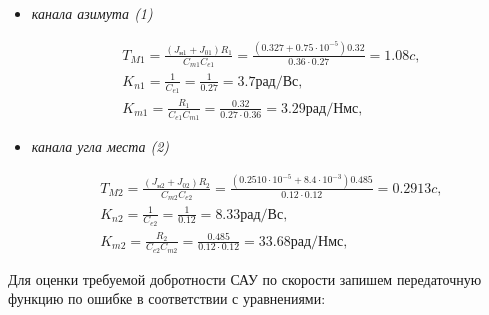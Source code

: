 \begin{itemize}
	\item \textit{канала азимута (1)}
	
	\begin{equation}
	\label{eq:p4:sec4/4}
	\begin{alignedat}{2}
	T_{M1}=
	\frac{ \left( J_{\textit{н1}}+J_{01} \right) R_{1}}{C_{m1}C_{e1}}=\frac{ \left( 0.327 + 0.75 \cdot 10^{-5} \right) 0.32}{0.36 \cdot 0.27}=
	1.08 \textit{c} ,\\
	K_{n1} = \frac{1}{C_{e1}} = \frac{1}{0.27} = 3.7 \textit{рад/Вс},\\
	K_{m1} = \frac{R_1}{C_{e1} C_{m1}} = \frac{0.32}{0.27 \cdot 0.36} = 3.29 \textit{рад/Нмс},
	\end{alignedat}
	\end{equation}
	
	\item \textit{канала угла места (2)}
	
	\begin{equation}
	\label{eq:p4:sec4/4+}
	\begin{alignedat}{2}
	T_{M2}=
	\frac{ \left( J_{\textit{н2}}+J_{02} \right) R_{2}}{C_{m2}C_{e2}}=\frac{ \left( 0.2510 \cdot 10^{-5} + 8.4 \cdot 10^{-3} \right) 0.485}{0.12 \cdot 0.12}=
	0.2913 \textit{c} ,\\
	K_{n2} = \frac{1}{C_{e2}} = \frac{1}{0.12} = 8.33 \textit{рад/Вс},\\
	K_{m2} = \frac{R_2}{C_{e2} C_{m2}} = \frac{0.485}{0.12 \cdot 0.12} = 33.68 \textit{рад/Нмс},
	\end{alignedat}
	\end{equation}
	
\end{itemize}



Для оценки требуемой добротности САУ по скорости запишем передаточную функцию по ошибке в соответствии с уравнениями:\par


